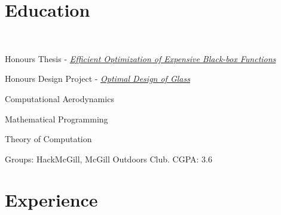 \documentclass[letterpaper]{deedy-resume} %
\begin{document}
\sectionspace %


\section{Education}

 \\

\begin{tightitemize}
\item Honours Thesis - \href{https://dl.dropboxusercontent.com/u/14503566/thesis.pdf}{\textit{Efficient Optimization of Expensive Black-box Functions}}

\item Honours Design Project - \href{https://dl.dropboxusercontent.com/u/14503566/thesis.pdf}{\textit{Optimal
Design of Glass}}
\end{tightitemize}

\insectionspace
{}
\begin{tightitemize}
\item Computational Aerodynamics
\item Mathematical Programming
\item Theory of Computation

\end{tightitemize}
\insectionspace

Groups: HackMcGill, McGill Outdoors Club. CGPA: 3.6

\sectionspace %


\section{Experience}

\end{document}
